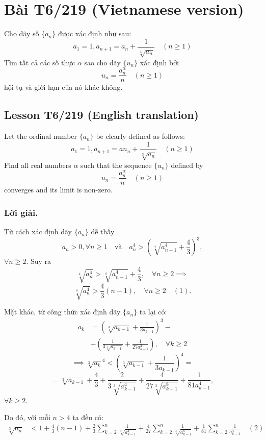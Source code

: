 \documentclass{article}
\begin{document}
\section{Bài T6/219 (Vietnamese version)} 

Cho dãy số $\{a_n\}$ được xác định như sau:
$$ a_1 = 1, a_{n+1} = a_n + \frac{1}{\sqrt[3]{a_n}} \quad (n \ge 1) $$
Tìm tất cả các số thực $\alpha$ sao cho dãy $\{u_n\}$ xác định bởi
$$ u_n = \frac{a_n^\alpha}{n} \quad (n \ge 1) $$
hội tụ và giới hạn của nó khác không.

\subsection{Lesson T6/219 (English translation)}

Let the ordinal number $\{a_n\}$ be clearly defined as follows:
$$ a_1 = 1, a_{n+1} = an_n + \frac{1}{\sqrt[3]{a_n}} \quad (n \ge 1) $$
Find all real numbers $\alpha$ such that the sequence $\{u_n\}$ defined by
$$ u_n = \frac{a_n^\alpha}{n} \quad (n \ge 1) $$
converges and its limit is non-zero.

\subsubsection*{Lời giải.}
Từ cách xác định dãy $\{a_n\}$ dễ thấy
$$ a_n > 0, \forall n \ge 1 \quad \text{và} \quad a_n^4 > \left(\sqrt[4]{a_{n-1}^4} + \frac{4}{3}\right)^3, $$
$\forall n \ge 2$. Suy ra
$$ \sqrt[4]{a_n^4} > \sqrt[4]{a_{n-1}^4} + \frac{4}{3}, \quad \forall n \ge 2 \implies $$
$$ \sqrt[4]{a_n^4} > \frac{4}{3}(n-1), \quad \forall n \ge 2 \quad (1). $$

Mặt khác, từ công thức xác định dãy $\{a_n\}$ ta lại có:
\begin{align*} a_k &= \left(\sqrt[3]{a_{k-1}} + \frac{1}{3a_{k-1}}\right)^3 - \\
&- \left(\frac{1}{3\sqrt[3]{a_{k-1}}} + \frac{1}{27a_{k-1}^3}\right), \quad \forall k \ge 2 \end{align*}
$$\implies \sqrt[3]{a_k}^4 < \left(\sqrt[3]{a_{k-1}} + \frac{1}{3 a_{k-1}}\right)^4 = $$
$$ = \sqrt[3]{a_{k-1}} + \frac{4}{3} + \frac{2}{3\sqrt[3]{a_{k-1}^4}} + \frac{4}{27\sqrt[3]{a_{k-1}^8}} + \frac{1}{81a_{k-1}^4}, $$
$\forall k \ge 2$.


Do đó, với mỗi $n > 4$ ta đều có:
\begin{align*}
\sqrt[3]{a_n} &< 1 + \frac{4}{3} (n-1) + 
\frac{2}{3}\sum_{k=2}^{n} \frac{1}{\sqrt[3]{a_{k-1}^4}} + 
\frac{4}{27}\sum_{k=2}^{n} \frac{1}{\sqrt[3]{a_{k-1}^8}} + 
\frac{1}{81}\sum_{k=2}^{n} \frac{1}{a_{k-1}^4} \quad (2)
\end{align*}
\end{document}
